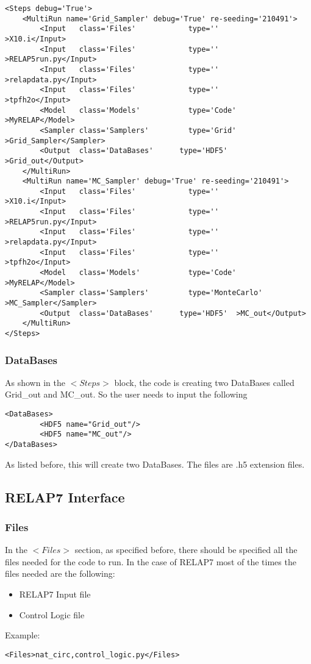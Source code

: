 \begin{lstlisting}[style=XML]
    <Steps debug='True'>
    <MultiRun name='Grid_Sampler' debug='True' re-seeding='210491'>
        <Input   class='Files'            type=''                >X10.i</Input>
        <Input   class='Files'            type=''                >RELAP5run.py</Input>
        <Input   class='Files'            type=''                >relapdata.py</Input>
        <Input   class='Files'            type=''                >tpfh2o</Input>
        <Model   class='Models'           type='Code'            >MyRELAP</Model>
        <Sampler class='Samplers'         type='Grid'             >Grid_Sampler</Sampler>
        <Output  class='DataBases'      type='HDF5'  >Grid_out</Output>
    </MultiRun>
	<MultiRun name='MC_Sampler' debug='True' re-seeding='210491'>
        <Input   class='Files'            type=''                >X10.i</Input>
        <Input   class='Files'            type=''                >RELAP5run.py</Input>
        <Input   class='Files'            type=''                >relapdata.py</Input>
        <Input   class='Files'            type=''                >tpfh2o</Input>
        <Model   class='Models'           type='Code'            >MyRELAP</Model>
        <Sampler class='Samplers'         type='MonteCarlo'             >MC_Sampler</Sampler>
        <Output  class='DataBases'      type='HDF5'  >MC_out</Output>
    </MultiRun>
</Steps>
\end{lstlisting}
\subsubsection{DataBases}
As shown in the $<Steps>$ block, the code is creating two DataBases called Grid\_out and MC\_out. So the user needs to input the following
\begin{lstlisting}[style=XML]
<DataBases>
        <HDF5 name="Grid_out"/> 
        <HDF5 name="MC_out"/> 
</DataBases>
\end{lstlisting}
As listed before, this will create two DataBases. The files are .h5 extension files. 

\subsection{RELAP7 Interface}
\subsubsection{Files}
In the $<Files>$ section, as specified before, there should be specified all the files needed for the code to run. In the case of RELAP7 most of the times the files needed are the following:
\begin{itemize}
\item RELAP7 Input file
\item Control Logic file
\end{itemize}
Example:
\begin{lstlisting}[style=XML]
<Files>nat_circ,control_logic.py</Files>
\end{lstlisting}
